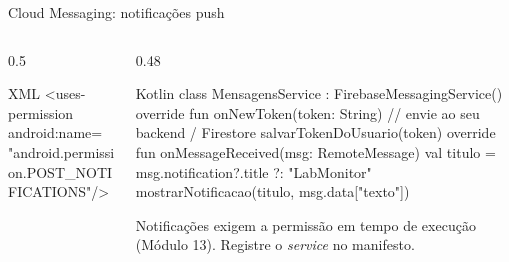 \documentclass[aspectratio=169,10pt]{beamer}
\begin{document}
\begin{frame}[fragile]{Cloud Messaging: notificações push}
  \begin{columns}[T]
    \begin{column}{0.5\textwidth}
      \centering
\begin{codigo}[title=AndroidManifest.xml]{XML}
<uses-permission android:name=
  "android.permission.POST_NOTIFICATIONS"/>
\end{codigo}
    \end{column}
    \begin{column}{0.48\textwidth}
\begin{codigo}[title=MensagensService.kt]{Kotlin}
class MensagensService : FirebaseMessagingService() {
  override fun onNewToken(token: String) {
    // envie ao seu backend / Firestore
    salvarTokenDoUsuario(token)
  }
  override fun onMessageReceived(msg: RemoteMessage) {
    val titulo = msg.notification?.title ?: "LabMonitor"
    mostrarNotificacao(titulo, msg.data["texto"])
  }
}
\end{codigo}
      \begin{atencao}[Android 13+]
        Notificações exigem a permissão em tempo de execução  (Módulo 13). Registre o \emph{service} no manifesto.
      \end{atencao}
    \end{column}
  \end{columns}
\end{frame}
\end{document}
